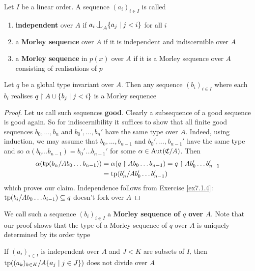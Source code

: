 \documentclass[11pt]{article}
\begin{document}
\begin{definition}[]
Let \(I\) be a linear order. A sequence \((a_i)_{i\in I}\) is called
\begin{enumerate}
\item \textbf{independent} over \(A\) if \(a_i\ind_A\{a_j\mid j<i\}\) for all \(i\)
\item a \textbf{Morley sequence} over \(A\) if it is independent and indiscernible over \(A\)
\item a \textbf{Morley sequence} in \(p(x)\) over \(A\) if it is a Morley sequence over \(A\) consisting of
realisations of \(p\)
\end{enumerate}
\end{definition}

\begin{examplle}[]
Let \(q\) be a global type invariant over \(A\). Then any sequence \((b_i)_{i\in I}\) where
each \(b_i\) realises \(q\upharpoonright A\cup\{b_j\mid j<i\}\) is a Morley sequence
\end{examplle}

\begin{proof}
Let us call such sequences \textbf{good}. Clearly a subsequence of a good sequence is good again. So for
indiscernibility it suffices to show that all finite good sequences \(b_0,\dots,b_n\)
and \(b_0',\dots,b_n'\) have the same type over \(A\). Indeed, using induction, we may assume
that \(b_0,\dots,b_{n-1}\) and \(b_0',\dots,b_{n-1}'\) have the same type and
so \(\alpha(b_0\dots b_{n-1})=b_0'\dots b_{n-1}'\) for some \(\alpha\in\operatorname{\text{Aut}}(\mathfrak{C}/A)\). Then
\begin{align*}
\alpha(\operatorname{tp}(b_n/Ab_0\dots b_{n-1}))&=\alpha(q\upharpoonright Ab_0\dots b_{n-1})=q\upharpoonright Ab_0'\dots b_{n-1}'\\
&=\operatorname{tp}(b_n'/Ab_0'\dots b_{n-1}')
\end{align*}
which proves our claim. Independence follows from Exercise \ref{ex7.1.4}:
\(\operatorname{tp}(b_i/Ab_0\dots b_{i-1})\subseteq q\) doesn't fork over \(A\)
\end{proof}

We call such a sequence \((b_i)_{i\in I}\) a \textbf{Morley sequence of \(q\) over \(A\)}. Note that our
proof shows that the type of a Morley sequence of \(q\) over \(A\) is uniquely determined by its
order type

\begin{lemma}[]
\label{lemma7.2.11}
If \((a_i)_{i\in I}\) is independent over \(A\) and \(J<K\) are subsets of \(I\),
then \(\operatorname{tp}((a_k)_{k\in K}/A\{a_j\mid j\in J\})\) does not divide over \(A\)
\end{lemma}
\end{document}
